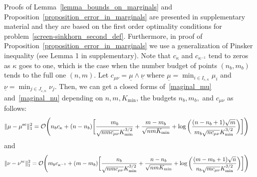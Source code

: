 Proofs of Lemma~\ref{lemma_bounds_on_marginals} and Proposition~\ref{proposition_error_in_marginals} are presented in supplementary material and they are based on the first order optimality conditions for problem~\eqref{screen-sinkhorn_second_def}. 
Furthermore, in proof of Proposition~\ref{proposition_error_in_marginals} we use a generalization of Pinsker inequality (see Lemma 1 in supplementary). 
Note that $c_\kappa$ and $c_{\kappa^{-1}}$ tend to zeros as $\kappa$ goes to one, which is the case when the number budget of points $(n_b,m_b)$ tends to the full one $(n,m)$.
Let $c_{\mu\nu} = \underline{\mu}\wedge \underline{\nu}$ where $\underline{\mu} = \min_{i\in I_{\varepsilon,\kappa}}\mu_i$ and $\underline{\nu} = \min_{j\in J_{\varepsilon,\kappa}}\nu_j$.
Then, we can get a closed forms of~\eqref{maginal_mu} and~\eqref{maginal_nu} depending on $n,m,K_{\min}$, the budgets $n_b,m_b,$ and $c_{\mu\nu}$ as follows:
\begin{align*}
{\|{\mu} -{\mu}^{\text{sc}}\|^2_1} = \mathcal{O}\Bigg(n_bc_\kappa + (n- n_b) \bigg[\frac{m_b}{\sqrt{nmc_{\mu\nu}}K_{\min}^{3/2}} &+ \frac{m-m_b}{\sqrt{nmK_{\min}}}
 + \log\bigg(\frac{(n-n_b+1)\sqrt{m}}{m_b \sqrt{nc_{\mu\nu}}K_{\min}^{3/2}} 
\bigg)\bigg]\Bigg)
\end{align*}
and 
\begin{align*}
{\|{\nu} -{\nu}^{\text{sc}}\|^2_1} = \mathcal{O}\Bigg(m_bc_{\kappa^{-1}} + (m- m_b) \bigg[\frac{n_b}{\sqrt{nmc_{\mu\nu}}K_{\min}^{3/2}} &+ \frac{n-n_b}{\sqrt{nmK_{\min}}}
 + \log\bigg(\frac{(m-m_b+1)\sqrt{n}}{n_b \sqrt{mc_{\mu\nu}}K_{\min}^{3/2}} 
\bigg)\bigg]\Bigg)
\end{align*}

